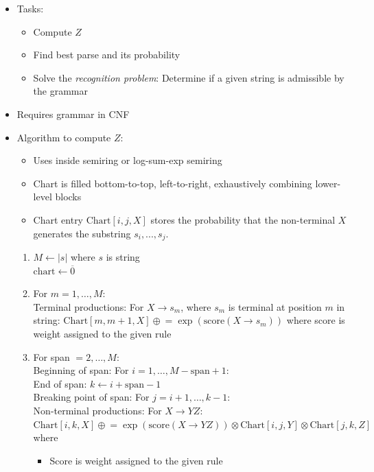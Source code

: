 \begin{itemize}
    \item Tasks:
    \begin{itemize}
        \item Compute $Z$
        \item Find best parse and its probability
        \item Solve the \emph{recognition problem}: Determine if a given string is admissible by the grammar
    \end{itemize}
    \item Requires grammar in CNF
    \item Algorithm to compute $Z$:
    \begin{itemize}
        \item Uses inside semiring or log-sum-exp semiring
        \item Chart is filled bottom-to-top, left-to-right, exhaustively combining lower-level blocks
        \item Chart entry $\textrm{Chart}[i, j, X]$ stores the probability that the non-terminal $X$ generates the substring $s_i, ..., s_j$.
    \end{itemize}
    \begin{enumerate}
        \item $M \gets |s|$ where $s$ is string\\
        $\textrm{chart} \gets \overline{0}$
        \item For $m = 1, \dots, M$:\\
        Terminal productions: For $X \to s_m$, where $s_m$ is terminal at position $m$ in string: $\textrm{Chart}[m, m+1, X] \mathrel{\oplus}= \exp(\textrm{score}(X \to s_m))$ where score is weight assigned to the given rule
        \item For span $= 2, \dots, M$:\\
        Beginning of span: For $i = 1, \dots, M-\textrm{span}+1$:\\
        End of span: $k \gets i + \textrm{span} - 1$\\
        Breaking point of span: For $j = i+1, \dots, k-1$:\\
        Non-terminal productions: For $X \to Y Z$:
        $\textrm{Chart}[i, k, X] \mathrel{\oplus}= \exp(\textrm{score}(X \to Y Z)) \otimes \textrm{Chart}[i, j, Y] \otimes \textrm{Chart}[j, k, Z]$ where
        \begin{itemize}
            \item Score is weight assigned to the given rule

\end{itemize}
\end{enumerate}
\end{itemize}
